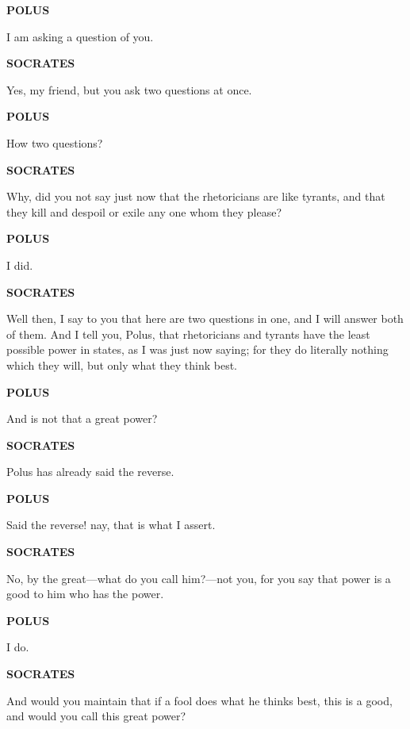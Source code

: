 \documentclass[11pt,letter]{article}
\begin{document}
\par \textbf{POLUS}
\par   I am asking a question of you.

\par \textbf{SOCRATES}
\par   Yes, my friend, but you ask two questions at once.

\par \textbf{POLUS}
\par   How two questions?

\par \textbf{SOCRATES}
\par   Why, did you not say just now that the rhetoricians are like tyrants, and that they kill and despoil or exile any one whom they please?

\par \textbf{POLUS}
\par   I did.

\par \textbf{SOCRATES}
\par   Well then, I say to you that here are two questions in one, and I will answer both of them. And I tell you, Polus, that rhetoricians and tyrants have the least possible power in states, as I was just now saying; for they do literally nothing which they will, but only what they think best.

\par \textbf{POLUS}
\par   And is not that a great power?

\par \textbf{SOCRATES}
\par   Polus has already said the reverse.

\par \textbf{POLUS}
\par   Said the reverse! nay, that is what I assert.

\par \textbf{SOCRATES}
\par   No, by the great—what do you call him?—not you, for you say that power is a good to him who has the power.

\par \textbf{POLUS}
\par   I do.

\par \textbf{SOCRATES}
\par   And would you maintain that if a fool does what he thinks best, this is a good, and would you call this great power?
\end{document}

